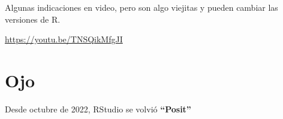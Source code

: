 \documentclass[
  letterpaper,
  DIV=11,
  numbers=noendperiod]{scrreprt}
\begin{document}
Algunas indicaciones en video, pero son algo viejitas y pueden cambiar
las versiones de R.

\url{https://youtu.be/TNSQikMfgJI}

\hypertarget{ojo}{%
\section*{Ojo}\label{ojo}}


Desde octubre de 2022, RStudio se volvió \textbf{``Posit''}
\end{document}
